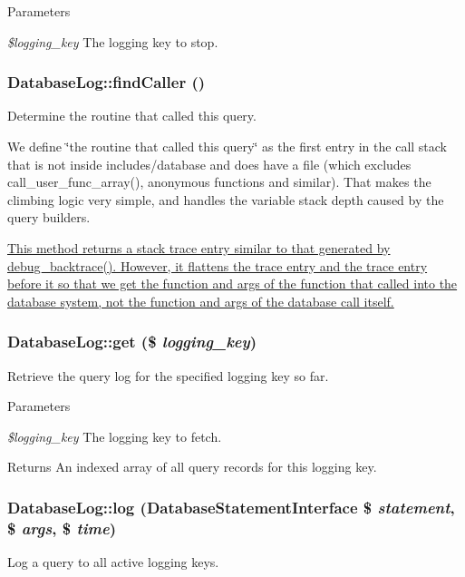 \begin{DoxyParams}{Parameters}
\item[{\em \$logging\_\-key}]The logging key to stop. \end{DoxyParams}
\hypertarget{classDatabaseLog_ae7b59ed8cd8e6163331d307db4531554}{
\subsubsection[{findCaller}]{\setlength{\rightskip}{0pt plus 5cm}DatabaseLog::findCaller ()}}
\label{classDatabaseLog_ae7b59ed8cd8e6163331d307db4531554}
Determine the routine that called this query.

We define \char`\"{}the routine that called this query\char`\"{} as the first entry in the call stack that is not inside includes/database and does have a file (which excludes call\_\-user\_\-func\_\-array(), anonymous functions and similar). That makes the climbing logic very simple, and handles the variable stack depth caused by the query builders.

\hyperlink{}{This method returns a stack trace entry similar to that generated by debug\_\-backtrace(). However, it flattens the trace entry and the trace entry before it so that we get the function and args of the function that called into the database system, not the function and args of the database call itself. }\hypertarget{classDatabaseLog_a2fb927cb8c8ddee8819fba8333f6edca}{
\subsubsection[{get}]{\setlength{\rightskip}{0pt plus 5cm}DatabaseLog::get (\$ {\em logging\_\-key})}}
\label{classDatabaseLog_a2fb927cb8c8ddee8819fba8333f6edca}
Retrieve the query log for the specified logging key so far.


\begin{DoxyParams}{Parameters}
\item[{\em \$logging\_\-key}]The logging key to fetch. \end{DoxyParams}
\begin{DoxyReturn}{Returns}
An indexed array of all query records for this logging key. 
\end{DoxyReturn}
\hypertarget{classDatabaseLog_a1059d7d9b785b085e609add4c7cbb7f5}{
\subsubsection[{log}]{\setlength{\rightskip}{0pt plus 5cm}DatabaseLog::log ({\bf DatabaseStatementInterface} \$ {\em statement}, \/  \$ {\em args}, \/  \$ {\em time})}}
\label{classDatabaseLog_a1059d7d9b785b085e609add4c7cbb7f5}
Log a query to all active logging keys.



